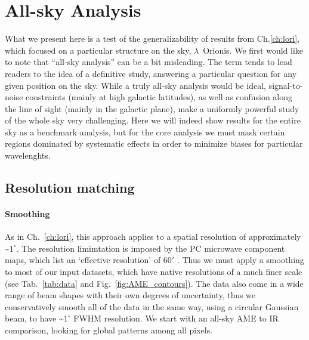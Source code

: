 \chapter{All-sky Analysis}
  \label{ch:allsky}
    What we present here is a test of the generalizability of results from Ch.\ref{ch:lori}, which focused on a particular structure on the sky, $\lambda$~Orionis.
    We first would like to note that ``all-sky analysis'' can be a bit misleading. The term tends to lead readers to the idea of a definitive study, answering a particular question for any given position on the sky.  While a truly all-sky analysis would be ideal, signal-to-noise constraints (mainly at high galactic latitudes), as well as confusion along the line of sight (mainly in the galactic plane), make a uniformly powerful study of the whole sky very challenging. Here we will indeed show results for the entire sky as a benchmark analysis, but for the core analysis we must mask certain regions dominated by systematic effects in order to minimize biases for particular wavelenghts.

\section{Resolution matching}
    \subsubsection{Smoothing}
        As in Ch.~\ref{ch:lori}, this approach applies to a spatial resolution of approximately \textasciitilde{}$1^{\circ}$. The resolution limimtation is imposed by the PC microwave component maps, which list an `effective resolution' of 60$'$ \citep{planck15X}. Thus we must apply a smoothing to most of our input datasets, which have native resolutions of a much finer scale (see Tab.~\ref{tab:data} and Fig.~\ref{fig:AME_contours}). The data also come in a wide range of beam shapes with their own degrees of uncertainty, thus we conservatively smooth all of the data in the same way, using a circular Gaussian beam, to have \textasciitilde{}$1^{\circ}$ FWHM resolution. We start with an all-sky AME to IR comparison, looking for global patterns among all pixels.

